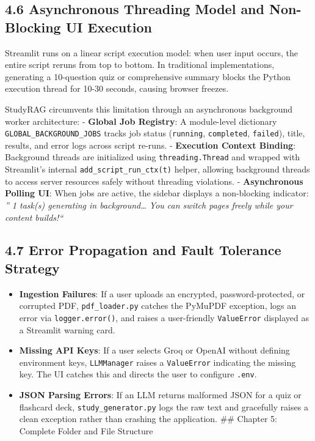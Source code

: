 \documentclass[
]{article}
\providecommand{\tightlist}{%
  \setlength{\itemsep}{0pt}\setlength{\parskip}{0pt}}
\begin{document}
\subsection{4.6 Asynchronous Threading Model and Non-Blocking UI
Execution}\label{asynchronous-threading-model-and-non-blocking-ui-execution}

Streamlit runs on a linear script execution model: when user input
occurs, the entire script reruns from top to bottom. In traditional
implementations, generating a 10-question quiz or comprehensive summary
blocks the Python execution thread for 10-30 seconds, causing browser
freezes.

StudyRAG circumvents this limitation through an asynchronous background
worker architecture: - \textbf{Global Job Registry}: A module-level
dictionary \texttt{GLOBAL\_\allowbreak BACKGROUND\_\allowbreak JOBS} tracks job status
(\texttt{running}, \texttt{completed}, \texttt{failed}), title, results,
and error logs across script re-runs. - \textbf{Execution Context
Binding}: Background threads are initialized using
\texttt{threading.\allowbreak Thread} and wrapped with Streamlit's internal
\texttt{add\_\allowbreak script\_\allowbreak run\_\allowbreak ctx(\allowbreak t)\allowbreak } helper, allowing background threads to
access server resources safely without threading violations. -
\textbf{Asynchronous Polling UI}: When jobs are active, the sidebar
displays a non-blocking indicator: \emph{'' 1 task(s) generating in
background\ldots{} You can switch pages freely while your content
builds!{\kern0pt}``}

\subsection{4.7 Error Propagation and Fault Tolerance
Strategy}\label{error-propagation-and-fault-tolerance-strategy}

\begin{itemize}
\tightlist
\item
  \textbf{Ingestion Failures}: If a user uploads an encrypted,
  password-protected, or corrupted PDF, \texttt{pdf\_\allowbreak loader.\allowbreak py} catches
  the PyMuPDF exception, logs an error via \texttt{logger.\allowbreak error(\allowbreak )\allowbreak }, and
  raises a user-friendly \texttt{ValueError} displayed as a Streamlit
  warning card.
\item
  \textbf{Missing API Keys}: If a user selects Groq or OpenAI without
  defining environment keys, \texttt{LLMManager} raises a
  \texttt{ValueError} indicating the missing key. The UI catches this
  and directs the user to configure \texttt{.\allowbreak env}.
\item
  \textbf{JSON Parsing Errors}: If an LLM returns malformed JSON for a
  quiz or flashcard deck, \texttt{study\_\allowbreak generator.\allowbreak py} logs the raw text
  and gracefully raises a clean exception rather than crashing the
  application. \#\# Chapter 5: Complete Folder and File Structure
\end{itemize}
\end{document}
